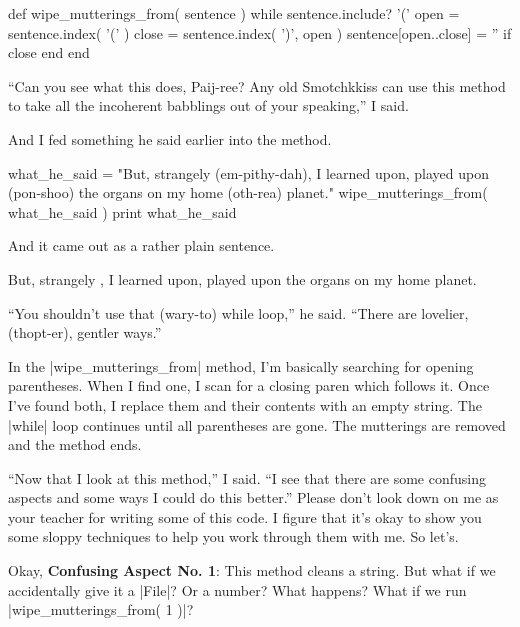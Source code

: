 \documentclass[12pt,twoside]{report}
\begin{document}
\begin{rubycode}

 def wipe_mutterings_from( sentence )
   while sentence.include? '('
     open = sentence.index( '(' )
     close = sentence.index( ')', open )
     sentence[open..close] = '' if close
   end
 end

\end{rubycode}


``Can you see what this does, Paij-ree?  Any old Smotchkkiss can use
this method to take all the incoherent babblings out of your
speaking,'' I said.

And I fed something he said earlier into the method.


\begin{rubycode}

 what_he_said = "But, strangely (em-pithy-dah),
   I learned upon, played upon (pon-shoo) the
   organs on my home (oth-rea) planet."
 wipe_mutterings_from( what_he_said )
 print what_he_said

\end{rubycode}


And it came out as a rather plain sentence.


\begin{consolecode}

 But, strangely ,
 I learned upon, played upon the
 organs on my home planet.

\end{consolecode}


``You shouldn't use that (wary-to) while loop,'' he said.  ``There are
lovelier, (thopt-er), gentler ways.''

In the \rubyinline|wipe_mutterings_from| method, I'm
basically searching for opening parentheses.  When I find one, I scan
for a closing paren which follows it.  Once I've found both, I replace
them and their contents with an empty string.  The
\rubyinline|while| loop continues until all
parentheses are gone. The mutterings are removed and the method ends.

``Now that I look at this method,'' I said.  ``I see that there are
some confusing aspects and some ways I could do this better.''  Please
don't look down on me as your teacher for writing some of this code.
I figure that it's okay to show you some sloppy techniques to help you
work through them with me.  So let's.

Okay, {\bf Confusing Aspect No. 1}: This method cleans a string.  But
what if we accidentally give it a \rubyinline|File|?
Or a number?  What happens?  What if we run
\rubyinline|wipe_mutterings_from( 1 )|?
\end{document}
